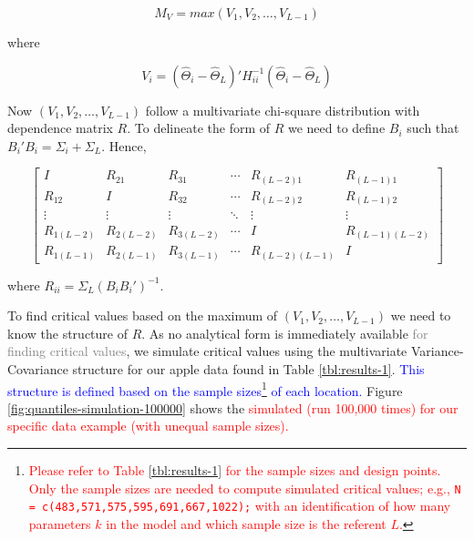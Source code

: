\documentclass[useAMS]{cJAS2e}
\newcommand{\added}[1]{\textcolor{blue}{#1}}
\newcommand{\changed}[1]{\textcolor{red}{#1}}
\newcommand{\removed}[1]{\textcolor{gray}{#1}}
\begin{document}
\begin{equation}\label{eqn:case-iii-max}
	M_V = max(V_1,V_2,\ldots,V_{L-1})
\end{equation}

\noindent where

\begin{equation}\label{eqn:case-iii-location}
	V_i = (\hat{\Theta}_i - \hat{\Theta}_L)' H_{ii}^{-1} (\hat{\Theta}_i - \hat{\Theta}_L)
\end{equation}

Now $(V_1,V_2,\ldots,V_{L-1})$ follow a multivariate chi-square distribution with dependence matrix $R$.  To delineate the form of $R$ we need to define $B_i$ such that $B_i' B_i = \Sigma_i + \Sigma_L$.  Hence,

\begin{equation}\label{eqn:case-iii-R}
		\left[
		\begin{array}{cccccc}
			I & R_{21} & R_{31} & \cdots & R_{(L-2)1} & R_{(L-1)1} \\
			R_{12} & I & R_{32} & \cdots & R_{(L-2)2} & R_{(L-1)2} \\
			\vdots & \vdots & \vdots & \ddots & \vdots & \vdots \\
			R_{1(L-2)} & R_{2(L-2)} & R_{3(L-2)} & \cdots & I & R_{(L-1)(L-2)} \\
			R_{1(L-1)} & R_{2(L-1)} & R_{3(L-1)} & \cdots & R_{(L-2)(L-1)} & I
		\end{array}
		\right]
\end{equation}


\noindent where $R_{ii} = \Sigma_L (B_i B_i')^{-1}$.

To find critical values based on the maximum of $(V_1,V_2,\ldots,V_{L-1})$ we need to know the structure of $R$.  As no analytical form is immediately available \removed{for finding critical values}, we simulate critical values using the multivariate Variance-Covariance structure for our apple data found in Table \ref{tbl:results-1}.  \added{This structure is defined based on the sample sizes\footnote{\changed{Please refer to Table \ref{tbl:results-1} for the sample sizes and design points.  Only the sample sizes are needed to compute simulated critical values; e.g., {\tt N = c(483,571,575,595,691,667,1022);} with an identification of how many parameters $k$ in the model and which sample size is the referent $L$.}} of each location.}   Figure \ref{fig:quantiles-simulation-100000} shows the \changed {simulated (run 100,000 times) for our specific data example (with unequal sample sizes).}
\end{document}
